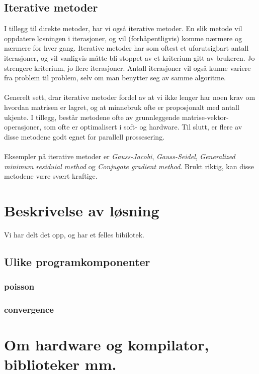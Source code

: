 \documentclass{article}
\begin{document}
\subsection{Iterative metoder}
I tillegg til direkte metoder, har vi også iterative metoder. En slik metode vil oppdatere løsningen i iterasjoner, og vil (forhåpentligvis) komme nærmere og nærmere for hver gang. Iterative metoder har som oftest et uforutsigbart antall iterasjoner, og vil vanligvis måtte bli stoppet av et kriterium gitt av brukeren. Jo strengere kriterium, jo flere iterasjoner. Antall iterasjoner vil også kunne variere fra problem til problem, selv om man benytter seg av samme algoritme.\\
\\
Generelt sett, drar iterative metoder fordel av at vi ikke lenger har noen krav om hvordan matrisen er lagret, og at minnebruk ofte er proposjonalt med antall ukjente. I tillegg, består metodene ofte av grunnleggende matrise-vektor-operasjoner, som ofte er optimalisert i soft- og hardware. Til slutt, er flere av disse metodene godt egnet for parallell prossesering. \\
\\
Eksempler på iterative metoder er \emph{Gauss-Jacobi}, \emph{Gauss-Seidel}, \emph{Generalized minimum residuial method} og \emph{Conjugate gradient method}. Brukt riktig, kan disse metodene være svært kraftige.

\section{Beskrivelse av løsning}
Vi har delt det opp, og har et felles bibilotek.

\subsection{Ulike programkomponenter}
\subsubsection{poisson}
\subsubsection{convergence}

\section{Om hardware og kompilator, biblioteker mm.}
\end{document}
